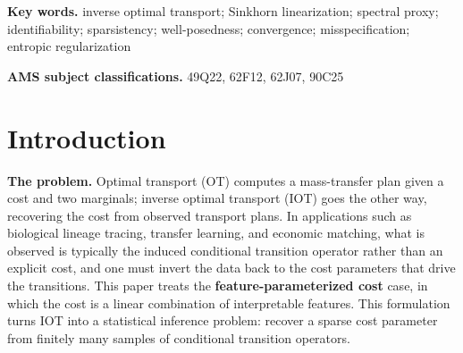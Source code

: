 \documentclass[11pt,a4paper]{article}
\theoremstyle{remark}
\begin{document}
\begin{abstract}
\textbf{Dependency structure.} T1 (identifiability) is the foundation; T3 and T4 are both
corollaries of the core spectral bound (Section~3), forming a well-posedness-and-convergence
package; T2 requires the additional IR condition (T1 + IR); O5 uses T1 + T3. All
identifiability and consistency statements are conditional on a fixed $\varepsilon$;
identifiability is taken modulo the scale coupling
$(\bm{\theta},\varepsilon)\mapsto(c\bm{\theta},c\varepsilon)$. The effective information
scale also depends on $\pi_{\min}(\bm{\theta},\varepsilon)\sqrt{\lambda_{\min}(\Sigma)}/\varepsilon$;
$\varepsilon\gg\mathrm{cond}(\Sigma)^{-1}$ is only an empirical heuristic, not a threshold
rigorously derived in this paper.
\end{abstract}

\noindent\textbf{Key words.} inverse optimal transport; Sinkhorn linearization; spectral
proxy; identifiability; sparsistency; well-posedness; convergence; misspecification;
entropic regularization

\noindent\textbf{AMS subject classifications.} 49Q22, 62F12, 62J07, 90C25

\section{Introduction}\label{sec:intro}

\textbf{The problem.} Optimal transport (OT) computes a mass-transfer plan given a cost and
two marginals; inverse optimal transport (IOT) goes the other way, recovering the cost from
observed transport plans. In applications such as biological lineage tracing, transfer
learning, and economic matching, what is observed is typically the induced conditional
transition operator rather than an explicit cost, and one must invert the data back to the
cost parameters that drive the transitions. This paper treats the
\textbf{feature-parameterized cost} case, in which the cost is a linear combination of
interpretable features. This formulation turns IOT into a statistical inference problem:
recover a sparse cost parameter from finitely many samples of conditional transition
operators.
\end{document}

